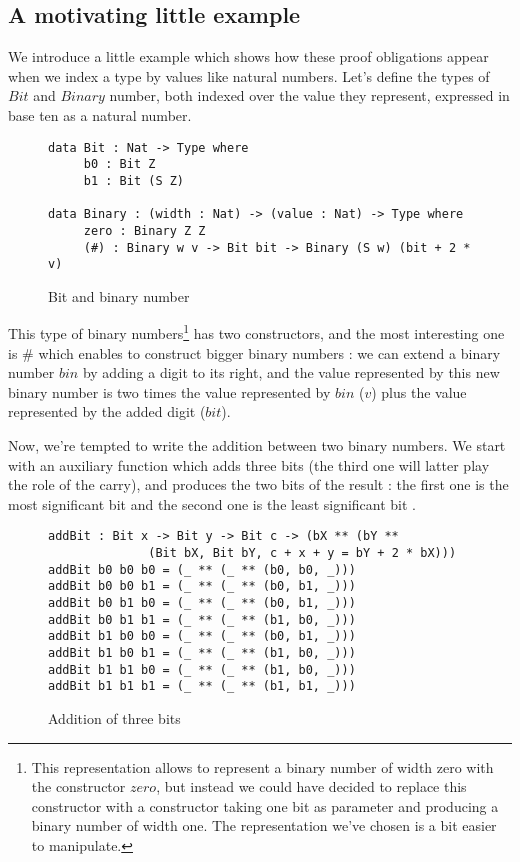 \subsection{A motivating little example}
We introduce a little example which shows how these proof obligations appear when we index a type by values like natural numbers.
Let's define the types of $Bit$ and $Binary$ number, both indexed over the value they represent, expressed in base ten as a natural number.
\begin{figure}[H]
\figrule
\begin{center}
\begin{verbatim}
data Bit : Nat -> Type where
     b0 : Bit Z
     b1 : Bit (S Z)
     
data Binary : (width : Nat) -> (value : Nat) -> Type where
     zero : Binary Z Z
     (#) : Binary w v -> Bit bit -> Binary (S w) (bit + 2 * v)
\end{verbatim}
\end{center}
\caption{Bit and binary number}
\figrule
\end{figure}

This type of binary numbers\footnote{This representation allows to represent a binary number of width zero with the constructor $zero$, but instead we could have decided to replace this constructor with a constructor taking one bit as parameter and producing a binary number of width one. The representation we've chosen is a bit easier to manipulate.}  has two constructors, and the most interesting one is $\#$ which enables to construct bigger binary numbers : we can extend a binary number $bin$ by adding a digit to its right, and the value represented by this new binary number is two times the value represented by $bin$ ($v$) plus the value represented by the added digit ($bit$).

Now, we're tempted to write the addition between two binary numbers.
We start with an auxiliary function which adds three bits (the third one will latter play the role of the carry), and produces the two bits of the result : the first one is the most significant bit and the second one is the least significant bit .

\begin{figure}[H]
\figrule
\begin{center}
\begin{verbatim}
addBit : Bit x -> Bit y -> Bit c -> (bX ** (bY ** 
              (Bit bX, Bit bY, c + x + y = bY + 2 * bX)))
addBit b0 b0 b0 = (_ ** (_ ** (b0, b0, _)))
addBit b0 b0 b1 = (_ ** (_ ** (b0, b1, _)))
addBit b0 b1 b0 = (_ ** (_ ** (b0, b1, _)))
addBit b0 b1 b1 = (_ ** (_ ** (b1, b0, _)))
addBit b1 b0 b0 = (_ ** (_ ** (b0, b1, _)))
addBit b1 b0 b1 = (_ ** (_ ** (b1, b0, _)))
addBit b1 b1 b0 = (_ ** (_ ** (b1, b0, _)))
addBit b1 b1 b1 = (_ ** (_ ** (b1, b1, _)))
\end{verbatim}
\end{center}
\caption{Addition of three bits}
\figrule
\end{figure}

